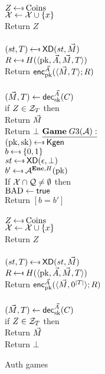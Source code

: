 \begin{figure}[tbhp]
\begin{center}
{\medskip
{}\\
  $Z \getsr \mathrm{Coins}$\\
  $\mathcal{X} \gets \mathcal{X} \cup \{x\}$\\
  Return $Z$\\
  
  \medskip
\procedurev{$\encOracle(\vad,\vmsg)$}\\
$(st, T) \getsr \mdalg(st,\vmsg)$\\
$R \getsr H(\langle \pk,\vad,\vmsg,\umd\rangle)$\\
Return ${\mathsf{enc}}_{\mathrm{pk}}^{\vec{A}}(\langle \vec{M},T\rangle; R)$\\

\medskip
{}\\
$(\vec{M},T) \gets {\mathsf{dec}}_{\mathrm{sk}}^{\vec{A}}(C)$\\
if $Z \in \mathcal{Z}_T$ then\\
\nudge Return $\vec{M}$\\
Return $\bot$
}
{
$\gamev{G3}{\advA}$\\
 $(\pk,\sk)\getsr\Kgen$\\
 $b \getsr \bits$ \\
 $st \getsr \mdalg(\epsilon,\bot)$\\
 $b' \getsr \advA^{\encOracle,H}(\pk)$\\
 If $\mathcal{X} \cap \mathcal{Q} \neq \emptyset$ then \\
\nudge $\mathrm{BAD} \gets\textsf{true}$\\
Return $[b=b']$\\ 

\medskip
{}\\
  $Z \getsr \mathrm{Coins}$\\
  $\mathcal{X} \gets \mathcal{X} \cup \{x\}$\\
  Return $Z$\\
  
  \medskip
\procedurev{$\encOracle(\vad,\vmsg)$}\\
$(st, T) \getsr \mdalg(st,\vmsg)$\\
$R \getsr H(\langle \pk,\vad,\vmsg,\umd\rangle)$\\
Return ${\mathsf{enc}}_{\mathrm{pk}}^{\vec{A}}(\langle \vec{M},0^{|T|}\rangle; R)$\\

\medskip
{}\\
$(\vec{M},T) \gets {\mathsf{dec}}_{\mathrm{sk}}^{\vec{A}}(C)$\\
if $Z \in \mathcal{Z}_T$ then\\
\nudge Return $\vec{M}$\\
Return $\bot$
}
\caption{Auth games}
\end{center}
\end{figure}

